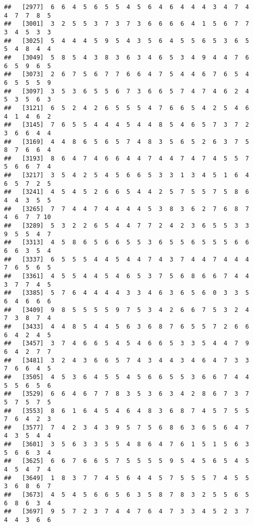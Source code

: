 \documentclass[
]{book}
\begin{document}
\begin{verbatim}
##   [2977]  6  6  4  5  6  5  5  4  5  6  4  6  4  4  4  3  4  7  4  4  7  7  8  5
##   [3001]  3  2  5  5  3  7  3  7  3  6  6  6  6  4  1  5  6  7  7  3  4  5  3  3
##   [3025]  5  4  4  4  5  9  5  4  3  5  6  4  5  5  6  5  3  6  5  5  4  8  4  4
##   [3049]  5  8  5  4  3  8  3  6  3  4  6  5  3  4  9  4  4  7  6  6  5  9  6  5
##   [3073]  2  6  7  5  6  7  7  6  6  4  7  5  4  4  6  7  6  5  4  6  5  5  5  9
##   [3097]  3  5  3  6  5  5  6  7  3  6  6  5  7  4  7  4  6  2  4  5  3  5  6  3
##   [3121]  6  5  2  4  2  6  5  5  5  4  7  6  6  5  4  2  5  4  6  4  1  4  6  2
##   [3145]  7  6  5  5  4  4  4  5  4  4  8  5  4  6  5  7  3  7  2  3  6  6  4  4
##   [3169]  4  4  8  6  5  6  5  7  4  8  3  5  6  5  2  6  3  7  5  8  7  6  6  4
##   [3193]  8  6  4  7  4  6  6  4  4  7  4  4  7  4  7  4  5  5  7  5  6  6  7  4
##   [3217]  3  5  4  2  5  4  5  6  6  5  3  3  1  3  4  5  1  6  4  6  5  7  2  5
##   [3241]  4  5  4  5  2  6  6  5  4  4  2  5  7  5  5  7  5  8  6  4  4  3  5  5
##   [3265]  7  7  4  4  7  4  4  4  4  5  3  8  3  6  2  7  6  8  7  4  6  7  7 10
##   [3289]  5  3  2  2  6  5  4  4  7  7  2  4  2  3  6  5  5  3  3  9  5  5  4  7
##   [3313]  4  5  8  6  5  6  6  5  5  3  6  5  5  6  5  5  5  6  6  6  6  3  5  4
##   [3337]  6  5  5  5  4  4  5  4  4  7  4  3  7  4  4  7  4  4  4  7  6  5  6  5
##   [3361]  4  5  5  4  4  5  4  6  5  3  7  5  6  8  6  6  7  4  4  3  7  7  4  5
##   [3385]  5  7  6  4  4  4  4  3  3  4  6  3  6  5  6  0  3  3  5  6  4  6  6  6
##   [3409]  9  8  5  5  5  5  9  7  5  3  4  2  6  6  7  5  3  2  4  7  3  8  7  4
##   [3433]  4  4  8  5  4  4  5  6  3  6  8  7  6  5  5  7  2  6  6  6  4  2  4  5
##   [3457]  3  7  4  6  6  5  4  5  4  6  6  5  3  3  5  4  4  7  9  6  4  2  7  7
##   [3481]  3  2  4  3  6  6  5  7  4  3  4  4  3  4  6  4  7  3  3  7  6  6  4  5
##   [3505]  4  5  3  6  4  5  5  4  5  6  6  5  5  3  6  6  7  4  4  5  5  6  5  6
##   [3529]  6  6  4  6  7  7  8  3  5  3  6  3  4  2  8  6  7  3  7  5  7  5  7  5
##   [3553]  8  6  1  6  4  5  4  6  4  8  3  6  8  7  4  5  7  5  5  7  6  4  2  3
##   [3577]  7  4  2  3  4  3  9  5  7  5  6  8  6  3  6  5  6  4  7  4  3  5  4  4
##   [3601]  3  5  6  3  3  5  5  4  8  6  4  7  6  1  5  1  5  6  3  5  6  6  3  4
##   [3625]  6  6  7  6  6  5  7  5  5  5  5  9  5  4  5  6  5  4  5  4  5  4  7  4
##   [3649]  1  8  3  7  7  4  5  6  4  4  5  7  5  5  5  7  4  5  5  3  6  8  6  7
##   [3673]  4  5  4  5  6  6  5  6  3  5  8  7  8  3  2  5  5  6  5  6  8  6  3  4
##   [3697]  9  5  7  2  3  7  4  4  7  6  4  7  3  3  4  5  2  3  7  4  4  3  6  6

\end{verbatim}
\end{document}
